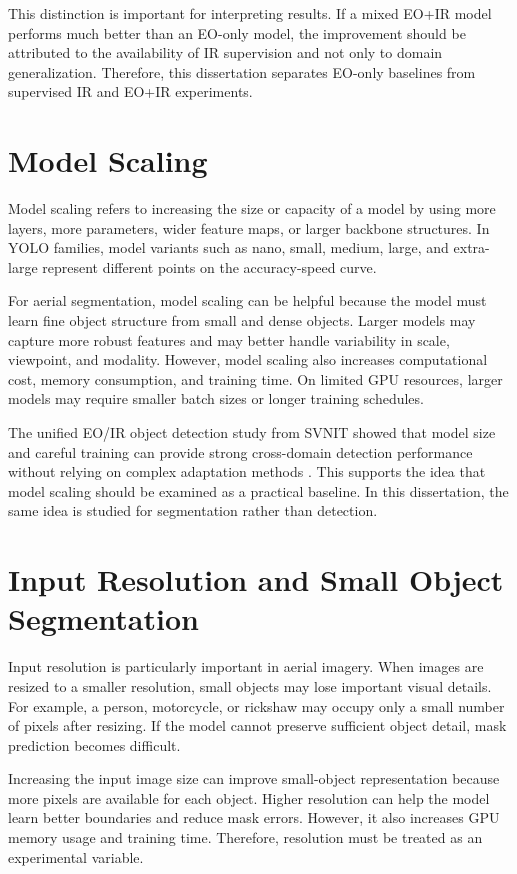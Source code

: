This distinction is important for interpreting results. If a mixed EO+IR model performs much better than an EO-only model, the improvement should be attributed to the availability of IR supervision and not only to domain generalization. Therefore, this dissertation separates EO-only baselines from supervised IR and EO+IR experiments.

\section{Model Scaling}

Model scaling refers to increasing the size or capacity of a model by using more layers, more parameters, wider feature maps, or larger backbone structures. In YOLO families, model variants such as nano, small, medium, large, and extra-large represent different points on the accuracy-speed curve.

For aerial segmentation, model scaling can be helpful because the model must learn fine object structure from small and dense objects. Larger models may capture more robust features and may better handle variability in scale, viewpoint, and modality. However, model scaling also increases computational cost, memory consumption, and training time. On limited GPU resources, larger models may require smaller batch sizes or longer training schedules.

The unified EO/IR object detection study from SVNIT showed that model size and careful training can provide strong cross-domain detection performance without relying on complex adaptation methods \cite{unifiedeoir2024}. This supports the idea that model scaling should be examined as a practical baseline. In this dissertation, the same idea is studied for segmentation rather than detection.

\section{Input Resolution and Small Object Segmentation}

Input resolution is particularly important in aerial imagery. When images are resized to a smaller resolution, small objects may lose important visual details. For example, a person, motorcycle, or rickshaw may occupy only a small number of pixels after resizing. If the model cannot preserve sufficient object detail, mask prediction becomes difficult.

Increasing the input image size can improve small-object representation because more pixels are available for each object. Higher resolution can help the model learn better boundaries and reduce mask errors. However, it also increases GPU memory usage and training time. Therefore, resolution must be treated as an experimental variable.

